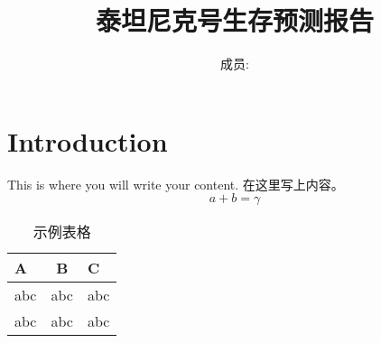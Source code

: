 \documentclass{article}
\title{泰坦尼克号生存预测报告}
\author{成员:}
\begin{document}
\maketitle{}
\section{Introduction}
This is where you will write your content. 在这里写上内容。
\begin{equation}
a+b=\gamma\label{eq}
\end{equation}

\begin{table}[ht]
 \caption{示例表格}
 \centering
 \label{tab}
 \begin{tabular}{lcl}
  \toprule
  A & B & C \\
  \midrule
 abc & abc & abc \\
 abc & abc & abc \\

  \bottomrule
 \end{tabular}
\end{table}
\end{document}
